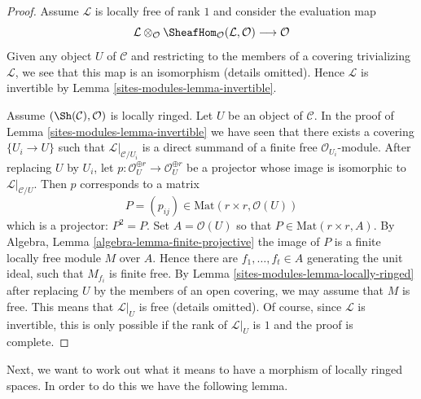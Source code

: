 \begin{proof}
Assume $\mathcal{L}$ is locally free of rank $1$ and consider the
evaluation map
$$
\mathcal{L} \otimes_\mathcal{O}
\SheafHom_\mathcal{O}(\mathcal{L}, \mathcal{O})
\longrightarrow \mathcal{O}
$$
Given any object $U$ of $\mathcal{C}$ and restricting to the members
of a covering trivializing $\mathcal{L}$, we see
that this map is an isomorphism (details omitted).
Hence $\mathcal{L}$ is invertible by Lemma \ref{sites-modules-lemma-invertible}.

\medskip\noindent
Assume $(\Sh(\mathcal{C}), \mathcal{O})$ is locally ringed.
Let $U$ be an object of $\mathcal{C}$.
In the proof of Lemma \ref{sites-modules-lemma-invertible}
we have seen that there exists a covering $\{U_i \to U\}$
such that $\mathcal{L}|_{\mathcal{C}/U_i}$ is a direct summand
of a finite free $\mathcal{O}_{U_i}$-module. After replacing
$U$ by $U_i$, let
$p : \mathcal{O}_U^{\oplus r} \to \mathcal{O}_U^{\oplus r}$
be a projector whose image is isomorphic to $\mathcal{L}|_{\mathcal{C}/U}$.
Then $p$ corresponds to a matrix
$$
P = (p_{ij}) \in \text{Mat}(r \times r, \mathcal{O}(U))
$$
which is a projector: $P^2  = P$. Set $A = \mathcal{O}(U)$
so that $P \in \text{Mat}(r \times r, A)$.
By Algebra, Lemma \ref{algebra-lemma-finite-projective}
the image of $P$ is a finite locally free module $M$ over $A$.
Hence there are $f_1, \ldots, f_t \in A$ generating the unit
ideal, such that $M_{f_i}$ is finite free. By
Lemma \ref{sites-modules-lemma-locally-ringed} after replacing $U$ by the members of an open
covering, we may assume that $M$ is free. This means that
$\mathcal{L}|_U$ is free (details omitted). Of course, since
$\mathcal{L}$ is invertible, this is
only possible if the rank of $\mathcal{L}|_U$ is $1$
and the proof is complete.
\end{proof}

Next, we want to work out what it means to have a morphism of locally ringed
spaces. In order to do this we have the following lemma.

